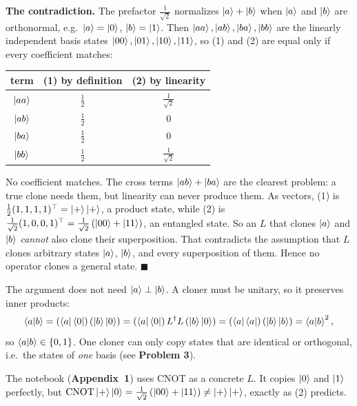 \documentclass[a4paper, 10pt]{article}
\begin{document}
\begin{solution}
	\noindent \textbf{The contradiction.} The prefactor \( \tfrac{1}{\sqrt{2}} \) normalizes \( \ket{a} + \ket{b} \) when \( \ket{a} \) and \( \ket{b} \) are orthonormal, e.g.\ \( \ket{a} = \ket{0} \), \( \ket{b} = \ket{1} \).
	Then \( \ket{aa}, \ket{ab}, \ket{ba}, \ket{bb} \) are the linearly independent basis states \( \ket{00}, \ket{01}, \ket{10}, \ket{11} \), so (1) and (2) are equal only if every coefficient matches:
	\begin{center}
		\begin{tabular}{ccc}
			\toprule
			term           & (1) by definition  & (2) by linearity          \\
			\midrule
			\( \ket{aa} \) & \( \tfrac{1}{2} \) & \( \tfrac{1}{\sqrt{2}} \) \\
			\( \ket{ab} \) & \( \tfrac{1}{2} \) & \( 0 \)                   \\
			\( \ket{ba} \) & \( \tfrac{1}{2} \) & \( 0 \)                   \\
			\( \ket{bb} \) & \( \tfrac{1}{2} \) & \( \tfrac{1}{\sqrt{2}} \) \\
			\bottomrule
		\end{tabular}
	\end{center}
	No coefficient matches. The cross terms \( \ket{ab} + \ket{ba} \) are the clearest problem: a true clone needs them, but linearity can never produce them.
	As vectors, (1) is \( \tfrac{1}{2}(1, 1, 1, 1)^{\top} = \ket{+}\ket{+} \), a product state, while (2) is \( \tfrac{1}{\sqrt{2}}(1, 0, 0, 1)^{\top} = \tfrac{1}{\sqrt{2}}\left(\ket{00} + \ket{11}\right) \), an entangled state.
	So an \( L \) that clones \( \ket{a} \) and \( \ket{b} \) \emph{cannot} also clone their superposition. That contradicts the assumption that \( L \) clones arbitrary states \( \ket{a} \), \( \ket{b} \), and every superposition of them.
	Hence no operator clones a general state. \( \blacksquare \)

	\begin{remark}
		The argument does not need \( \ket{a} \perp \ket{b} \). A cloner must be unitary, so it preserves inner products:
		\[
			\braket{a \vert b}
			= \left(\bra{a}\bra{0}\right)\left(\ket{b}\ket{0}\right)
			= \left(\bra{a}\bra{0}\right) L^{\dagger} L \left(\ket{b}\ket{0}\right)
			= \left(\bra{a}\bra{a}\right)\left(\ket{b}\ket{b}\right)
			= \braket{a \vert b}^2 ,
		\]
		so \( \braket{a \vert b} \in \{0, 1\} \). One cloner can only copy states that are identical or orthogonal, i.e.\ the states of \emph{one} basis (see \textbf{Problem 3}).
	\end{remark}
	The notebook (\textbf{Appendix~1}) uses CNOT as a concrete \( L \). It copies \( \ket{0} \) and \( \ket{1} \) perfectly, but \( \mathrm{CNOT}\ket{+}\ket{0} = \tfrac{1}{\sqrt{2}}\left(\ket{00} + \ket{11}\right) \neq \ket{+}\ket{+} \), exactly as (2) predicts.
\end{solution}
\end{document}
